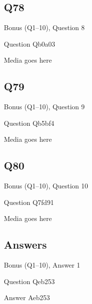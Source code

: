 \documentclass[11pt]{beamer}
\begin{document}
\subsection*{Q78}
\begin{frame}[t]{Bonus (Q1--10), Question 8}
\vspace{2em}
\begin{block}{Question}
Qb0a03
\end{block}
\begin{center}
Media goes here
\end{center}
\end{frame}
    

\subsection*{Q79}
\begin{frame}[t]{Bonus (Q1--10), Question 9}
\vspace{2em}
\begin{block}{Question}
Qb5bf4
\end{block}
\begin{center}
Media goes here
\end{center}
\end{frame}
    

\subsection*{Q80}
\begin{frame}[t]{Bonus (Q1--10), Question 10}
\vspace{2em}
\begin{block}{Question}
Q7fd91
\end{block}
\begin{center}
Media goes here
\end{center}
\end{frame}
    
\subsection{Answers}

\begin{frame}[t]{Bonus (Q1--10), Answer 1}
\vspace{2em}
\begin{block}{Question}
Qeb253
\end{block}
\pause{}
\begin{block}{Answer}
Aeb253
\end{block}
\end{frame}
    
\end{document}
